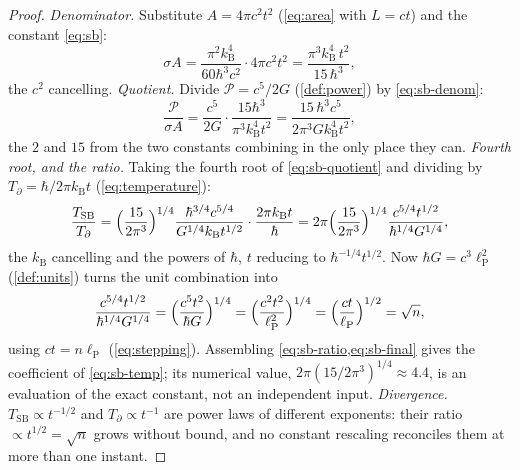 \documentclass[11pt]{amsbook}
\theoremstyle{plain}
\theoremstyle{definition}
\theoremstyle{remark}
\begin{document}
\begin{proof}
\emph{Denominator.} Substitute $A = 4\pi c^{2}t^{2}$ (\cref{eq:area} with $L = ct$) and the constant \cref{eq:sb}:
\begin{equation}\label{eq:sb-denom}
\sigma A = \frac{\pi^{2}k_{\mathrm B}^{4}}{60\hbar^{3}c^{2}}\cdot 4\pi c^{2}t^{2} = \frac{\pi^{3} k_{\mathrm B}^{4}\,t^{2}}{15\,\hbar^{3}},
\end{equation}
the $c^{2}$ cancelling. \emph{Quotient.} Divide $\mathcal P = c^{5}/2G$ (\cref{def:power}) by \cref{eq:sb-denom}:
\begin{equation}\label{eq:sb-quotient}
\frac{\mathcal P}{\sigma A} = \frac{c^{5}}{2G}\cdot\frac{15\hbar^{3}}{\pi^{3}k_{\mathrm B}^{4}t^{2}} = \frac{15\,\hbar^{3}c^{5}}{2\pi^{3} G k_{\mathrm B}^{4} t^{2}},
\end{equation}
the $2$ and $15$ from the two constants combining in the only place they can. \emph{Fourth root, and the ratio.} Taking the fourth root of \cref{eq:sb-quotient} and dividing by $T_{\partial} = \hbar/2\pi k_{\mathrm B}t$ (\cref{eq:temperature}):
\begin{equation}\label{eq:sb-ratio}
\frac{T_{\mathrm{SB}}}{T_{\partial}} = \Bigl(\frac{15}{2\pi^{3}}\Bigr)^{1/4}\frac{\hbar^{3/4}c^{5/4}}{G^{1/4}k_{\mathrm B}t^{1/2}}\cdot\frac{2\pi k_{\mathrm B}t}{\hbar}
= 2\pi\Bigl(\frac{15}{2\pi^{3}}\Bigr)^{1/4}\frac{c^{5/4}t^{1/2}}{\hbar^{1/4}G^{1/4}},
\end{equation}
the $k_{\mathrm B}$ cancelling and the powers of $\hbar$, $t$ reducing to $\hbar^{-1/4}t^{1/2}$. Now $\hbar G = c^{3}\ell_{\mathrm P}^{2}$ (\cref{def:units}) turns the unit combination into
\begin{equation}\label{eq:sb-final}
\frac{c^{5/4}t^{1/2}}{\hbar^{1/4}G^{1/4}} = \Bigl(\frac{c^{5}t^{2}}{\hbar G}\Bigr)^{1/4} = \Bigl(\frac{c^{2}t^{2}}{\ell_{\mathrm P}^{2}}\Bigr)^{1/4} = \Bigl(\frac{ct}{\ell_{\mathrm P}}\Bigr)^{1/2} = \sqrt{n},
\end{equation}
using $ct = n\ell_{\mathrm P}$ (\cref{eq:stepping}). Assembling \cref{eq:sb-ratio,eq:sb-final} gives the coefficient of \cref{eq:sb-temp}; its numerical value, $2\pi(15/2\pi^{3})^{1/4} \approx 4.4$, is an evaluation of the exact constant, not an independent input. \emph{Divergence.} $T_{\mathrm{SB}} \propto t^{-1/2}$ and $T_{\partial} \propto t^{-1}$ are power laws of different exponents: their ratio $\propto t^{1/2} = \sqrt{n}$ grows without bound, and no constant rescaling reconciles them at more than one instant.
\end{proof}
\end{document}
